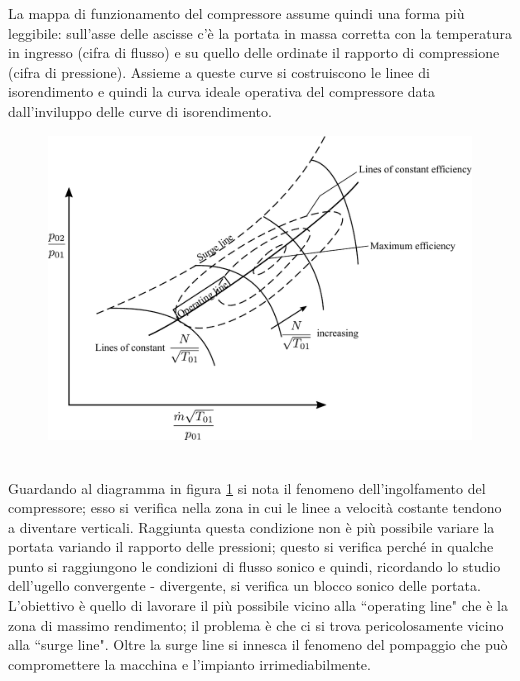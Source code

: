 La mappa di funzionamento del compressore assume quindi una forma più leggibile: sull'asse delle ascisse c'è la portata in massa corretta con la temperatura in ingresso (cifra di flusso) e su quello delle ordinate il rapporto di compressione (cifra di pressione). Assieme a queste curve si costruiscono le linee di isorendimento e quindi la curva ideale operativa del compressore data dall'inviluppo delle curve di isorendimento.
\begin{figure}
\centering
  \includegraphics[width=.8\textwidth]{fig/secondo_8.pdf}
\caption{}
\label{fig:secondo_8}
\end{figure}
\\Guardando al diagramma in figura \ref{fig:secondo_8} si nota il fenomeno dell'ingolfamento del compressore; esso si verifica nella zona in cui le linee a velocità costante tendono a diventare verticali. Raggiunta questa condizione non è più possibile variare la portata variando il rapporto delle pressioni; questo si verifica perché in qualche punto si raggiungono le condizioni di flusso sonico e quindi, ricordando lo studio dell'ugello convergente - divergente, si verifica un
blocco sonico delle portata.\\
L'obiettivo è quello di lavorare il più possibile vicino alla ``operating line" che è la zona di massimo rendimento; il problema è che ci si trova pericolosamente vicino alla ``surge line". Oltre la surge line si innesca il fenomeno del pompaggio che può compromettere la macchina e l'impianto irrimediabilmente.
